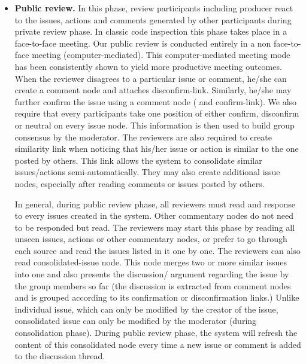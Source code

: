 \begin {itemize}
The reviewer may also create a case node when he/she has difficulty
verifying specific property of the source as described in the
previous section.

The private review phase concludes when all reviewers have marked the
source nodes reviewed. The moderator (running the system in Admin
mode) then deactivates this phase and activates the next phase, Public
Review. 


\item {\bf Public review.} In this phase,  review participants
including producer react to the 
issues, actions and comments generated by other participants during
private review phase.  In classic code inspection this phase takes
place in a 
face-to-face meeting. Our public review is conducted entirely in a non
face-to-face meeting (computer-mediated). This computer-mediated
meeting mode has been consistently shown \cite{Nunamaker91} to yield  more productive
meeting outcomes. When the reviewer disagrees to a particular issue or
comment, he/she can create a comment node and attaches disconfirm-link.
Similarly, he/she may further confirm the issue using a comment node (
and confirm-link). We also require that every participants take one
position of either confirm, disconfirm or neutral on every issue
node. This information is then used to build group consensus by the
moderator. The reviewers are also required to create similarity link
when noticing that his/her issue or action is similar to the one
posted by others. This link allows the system to consolidate similar
issues/actions semi-automatically. They may also create additional
issue nodes, especially after reading comments or issues posted by
others. 

In general, during public review phase, all reviewers must read and
response to every issues created in 
the system. Other commentary nodes do not need to be responded but
read. 
The reviewers may start this phase by reading all unseen issues,
actions or other commentary nodes, or prefer to go through each source
and read the issues listed in it one by one. The reviewers can also read 
consolidated-issue node. This node merges two or more similar issues
into one and also presents the discussion/ argument regarding the
issue by the group 
members so far (the discussion is extracted from comment nodes and is
grouped according to its confirmation or disconfirmation links.)
Unlike individual issue, which can only be modified by the creator of the 
issue, consolidated issue can only be modified by the moderator (during
consolidation phase). During public review phase, the system will
refresh the content of this consolidated node every time a new 
issue or comment is added to the discussion thread. 


\end{itemize}

